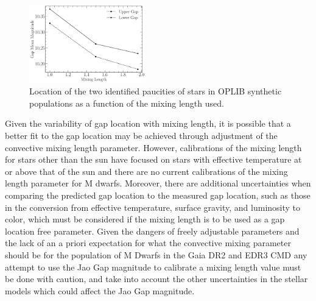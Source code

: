 \begin{figure}
	\centering
	\includegraphics[width=0.45\textwidth]{./MixingLengthScaling.pdf}
	\caption{Location of the two identified paucities of stars in OPLIB synthetic
	populations as a function of the mixing length used.}
	\label{fig:MixingLengthScaling}
\end{figure}

Given the variability of gap location with mixing length, it is possible that a
better fit to the gap location may be achieved through adjustment of the
convective mixing length parameter. However, calibrations of the mixing length
for stars other than the sun have focused on stars with effective temperature
at or above that of the sun and there are no current calibrations of the mixing
length parameter for M dwarfs. Moreover, there are additional uncertainties
when comparing the predicted gap location to the measured gap location, such as
those in the conversion from effective temperature, surface gravity, and
luminosity to color, which must be considered if the mixing length is to be
used as a gap location free parameter. Given the dangers of freely adjustable
parameters and the lack of an a priori expectation for what the convective
mixing parameter should be for the population of M Dwarfs in the Gaia DR2 and
EDR3 CMD any attempt to use the Jao Gap magnitude to calibrate a mixing length
value must be done with caution, and take into account the other uncertainties
in the stellar models which could affect the Jao Gap magnitude.

